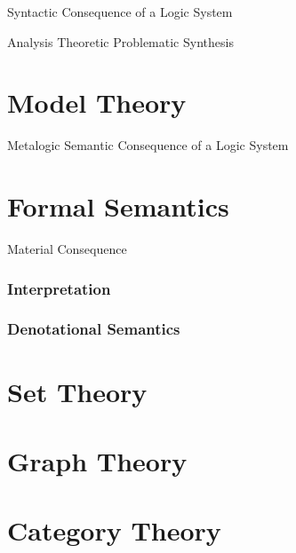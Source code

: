 \documentclass{article}
\begin{document}
Syntactic Consequence of a Logic System

Analysis
    Theoretic
    Problematic
Synthesis


\part{Model Theory}\label{sec:model_theory}
Metalogic
Semantic Consequence of a Logic System

\part{Formal Semantics}

Material Consequence
\section{Interpretation}\label{sec:interpretation}
\section{Denotational Semantics}

\part{Set Theory}

\part{Graph Theory}

\part{Category Theory}
\end{document}
